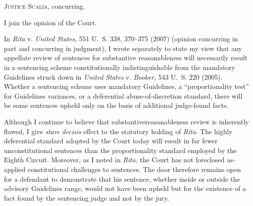 
\setcounter{page}{60}

  \textsc{Justice Scalia,} concurring.

  I join the opinion of the Court.

  In \emph{Rita} v. \emph{United States,} 551 U.~S. 338, 370--375 (2007)
(opinion concurring in part and concurring in judgment), I wrote
separately to state my view that any appellate review of sentences for
substantive reasonableness will necessarily result in a sentencing
scheme constitutionally indistinguishable from the mandatory Guidelines
struck down in \emph{United States} v. \emph{Booker,} 543 U.~S. 220
(2005). Whether a sentencing scheme uses mandatory Guidelines, a
``proportionality test'' for Guidelines variances, or a deferential
abuse-of-discretion standard, there will be some sentences upheld only
on the basis of additional judge-found facts.

  Although I continue to believe that substantivereasonableness review
is inherently flawed, I give \emph{stare decisis} effect to the statutory
holding of \emph{Rita.} The highly deferential standard adopted by the
Court today will result in far fewer unconstitutional sentences than
the proportionality standard employed by the Eighth Circuit. Moreover,
as I noted in \emph{Rita,} the Court has not foreclosed as-applied
constitutional challenges to sentences. The door therefore remains open
for a defendant to demonstrate that his sentence, whether inside or
outside the advisory Guidelines range, would not have been upheld but
for the existence of a fact found by the sentencing judge and not by the
jury.
